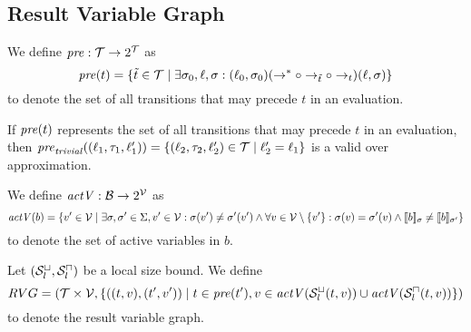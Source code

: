 \subsection{Result Variable Graph}


\begin{definition} 
  We define $\mathit{pre}: \mathcal{T} \rightarrow 2^{\mathcal{T}}$ as
  \[\mathit{pre}(t) = \lbrace \tilde{t} \in \mathcal{T} \mid \exists \sigma_0, \ell, \sigma: (\ell_0, \sigma_0) (\rightarrow^* \circ \rightarrow_{\tilde{t}} \circ \rightarrow_{t}) (\ell, \sigma) \rbrace\]
  to denote the set of all transitions that may precede $t$ in an evaluation.	
\end{definition}

If $\mathit{pre}(t)$ represents the set of all transitions that may precede $t$ in an evaluation, then $\mathit{pre}_{\mathit{trivial}}((\ell_1, \tau_1, \ell_1')) = \lbrace (\ell_2, \tau_2, \ell_2') \in \mathcal{T} \mid \ell_2' = \ell_1 \rbrace$ is a valid over approximation.


\begin{definition} 
	We define $\mathit{actV}: \mathcal{B} \rightarrow 2^{\mathcal{V}}$ as 
	\[ \mathit{actV}(b) = \lbrace  v' \in \mathcal{V} \mid \exists \sigma, \sigma' \in \Sigma, v' \in \mathcal{V}: \sigma(v') \neq \sigma'(v') \wedge \forall v \in \mathcal{V} \setminus \lbrace v' \rbrace: \sigma(v) = \sigma'(v) \wedge \llbracket b \rrbracket_{\sigma} \neq \llbracket b \rrbracket_{\sigma'} \rbrace \]
	to denote the set of active variables in $b$.
\end{definition}

\begin{definition}
	Let ${({\mathcal{S}^\sqcup_l}, {\mathcal{S}^\sqcap_l})}$ be a local size bound.
	We define 
	\[ RVG = (\mathcal{T} \times \mathcal{V}, \lbrace ((t, v), (t', v')) \mid t \in \mathit{pre}(t'), v \in \mathit{actV}({\mathcal{S}^\sqcup_l}(t,v)) \cup \mathit{actV}({\mathcal{S}^\sqcap_l}(t,v)) \rbrace) \]
	to denote the result variable graph.
\end{definition}
